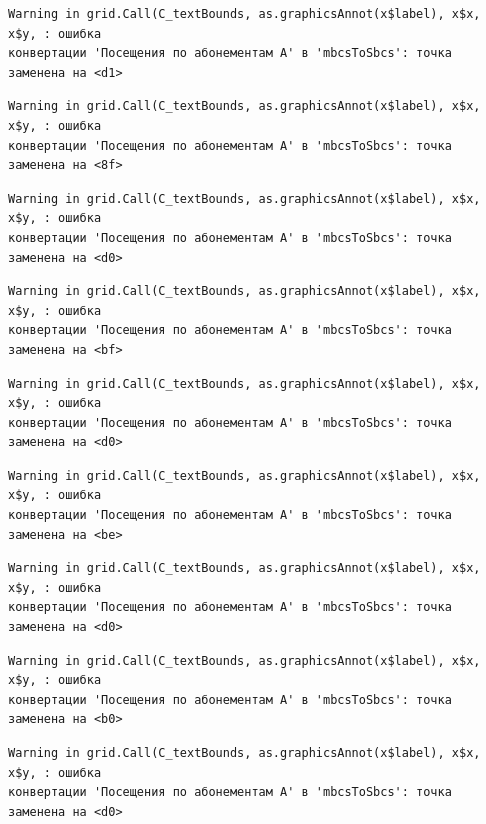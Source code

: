 \documentclass[
  letterpaper,
  DIV=11,
  numbers=noendperiod]{scrreprt}
\begin{document}
\begin{verbatim}
Warning in grid.Call(C_textBounds, as.graphicsAnnot(x$label), x$x, x$y, : ошибка
конвертации 'Посещения по абонементам А' в 'mbcsToSbcs': точка заменена на <d1>
\end{verbatim}

\begin{verbatim}
Warning in grid.Call(C_textBounds, as.graphicsAnnot(x$label), x$x, x$y, : ошибка
конвертации 'Посещения по абонементам А' в 'mbcsToSbcs': точка заменена на <8f>
\end{verbatim}

\begin{verbatim}
Warning in grid.Call(C_textBounds, as.graphicsAnnot(x$label), x$x, x$y, : ошибка
конвертации 'Посещения по абонементам А' в 'mbcsToSbcs': точка заменена на <d0>
\end{verbatim}

\begin{verbatim}
Warning in grid.Call(C_textBounds, as.graphicsAnnot(x$label), x$x, x$y, : ошибка
конвертации 'Посещения по абонементам А' в 'mbcsToSbcs': точка заменена на <bf>
\end{verbatim}

\begin{verbatim}
Warning in grid.Call(C_textBounds, as.graphicsAnnot(x$label), x$x, x$y, : ошибка
конвертации 'Посещения по абонементам А' в 'mbcsToSbcs': точка заменена на <d0>
\end{verbatim}

\begin{verbatim}
Warning in grid.Call(C_textBounds, as.graphicsAnnot(x$label), x$x, x$y, : ошибка
конвертации 'Посещения по абонементам А' в 'mbcsToSbcs': точка заменена на <be>
\end{verbatim}

\begin{verbatim}
Warning in grid.Call(C_textBounds, as.graphicsAnnot(x$label), x$x, x$y, : ошибка
конвертации 'Посещения по абонементам А' в 'mbcsToSbcs': точка заменена на <d0>
\end{verbatim}

\begin{verbatim}
Warning in grid.Call(C_textBounds, as.graphicsAnnot(x$label), x$x, x$y, : ошибка
конвертации 'Посещения по абонементам А' в 'mbcsToSbcs': точка заменена на <b0>
\end{verbatim}

\begin{verbatim}
Warning in grid.Call(C_textBounds, as.graphicsAnnot(x$label), x$x, x$y, : ошибка
конвертации 'Посещения по абонементам А' в 'mbcsToSbcs': точка заменена на <d0>
\end{verbatim}
\end{document}
